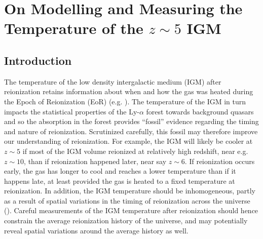 

\ifpdf
    \graphicspath{{igm_temperature/figures/PNG/}{bubble_finding/figures/PDF/}{bubble_finding/figures/}}
\else
    \graphicspath{{igm_temperature/figures/EPS/}{example_chapter/figures/}}
\fi


\chapter{On Modelling and Measuring the Temperature of the $z \sim 5$ IGM}\label{sec:IGMTemperature}

\section{Introduction} \label{sec:IGMTemperatureIntro}

The temperature of the low density intergalactic medium (IGM) after reionization retains information about
when and how the gas was heated during the Epoch of Reionization (EoR) (e.g. \citealt{1994MNRAS.266..343M,Hui:1997dp,Theuns:2002yc,Hui:2003hn}).
The temperature of the IGM in turn
impacts the statistical properties of the Ly-$\alpha$ forest towards background quasars and so the absorption in the
forest provides ``fossil'' evidence regarding the timing and nature of reionization. Scrutinized carefully, this
fossil may therefore improve our understanding of reionization. For example, the IGM will likely be cooler at $z \sim 5$ if most of the IGM volume
reionized at relatively high redshift, near e.g. $z \sim 10$, than if reionization happened later, near say $z \sim 6$. If reionization occurs
early, the gas has longer to cool and reaches a lower temperature than if it happens late, at least provided the gas is heated to a fixed
temperature at reionization. In addition, the IGM temperature should be inhomogeneous, partly as a result of spatial
variations in the timing of reionization across the universe (\citealt{Trac:2008yz,Cen:2009bg,Furlanetto:2009kr}). Careful measurements of the IGM temperature after reionization should hence
constrain the average reionization history of the universe, and may potentially reveal spatial variations around the average 
history as well.

